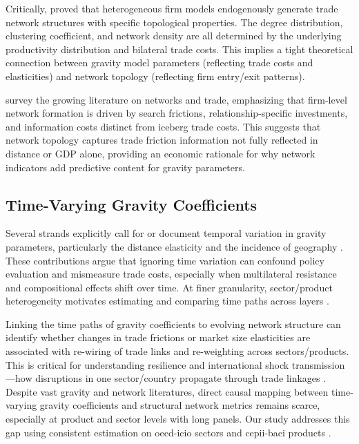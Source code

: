 \documentclass[preprint, 3p,
authoryear]{elsarticle} %
\begin{document}
Critically, \citet{chaney2014} proved that heterogeneous firm models
endogenously generate trade network structures with specific topological
properties. The degree distribution, clustering coefficient, and network
density are all determined by the underlying productivity distribution
and bilateral trade costs. This implies a tight theoretical connection
between gravity model parameters (reflecting trade costs and
elasticities) and network topology (reflecting firm entry/exit
patterns).

\citet{bernard2018networks} survey the growing literature on networks
and trade, emphasizing that firm-level network formation is driven by
search frictions, relationship-specific investments, and information
costs distinct from iceberg trade costs. This suggests that network
topology captures trade friction information not fully reflected in
distance or GDP alone, providing an economic rationale for why network
indicators add predictive content for gravity parameters.

\subsection{Time-Varying Gravity Coefficients}\label{subsec:timevarying}

Several strands explicitly call for or document temporal variation in
gravity parameters, particularly the distance elasticity and the
incidence of geography
\citep{brun2005, disdier2008, berthelon2008, andersonyotov2010, yotov2012, novy2013, headmayer2014}.
These contributions argue that ignoring time variation can confound
policy evaluation and mismeasure trade costs, especially when
multilateral resistance and compositional effects shift over time. At
finer granularity, sector/product heterogeneity motivates estimating and
comparing time paths across layers
\citep{baldwinharrigan2011, hummels2005, egger2015}.

Linking the time paths of gravity coefficients to evolving network
structure can identify whether changes in trade frictions or market size
elasticities are associated with re-wiring of trade links and
re-weighting across sectors/products. This is critical for understanding
resilience and international shock transmission---how disruptions in one
sector/country propagate through trade linkages
\citep{acemoglu2012, carvalho2014, digiovanni2020, boehm2019, bonadio2021, carvalho2021, vespignani2012}.
Despite vast gravity and network literatures, direct causal mapping
between time-varying gravity coefficients and structural network metrics
remains scarce, especially at product and sector levels with long
panels. Our study addresses this gap using consistent estimation on
\gls{oecd}-\gls{icio} sectors and \gls{cepii}-\gls{baci} products
\citep{gaulier2010, mayer2011, timmer2015}.
\end{document}
